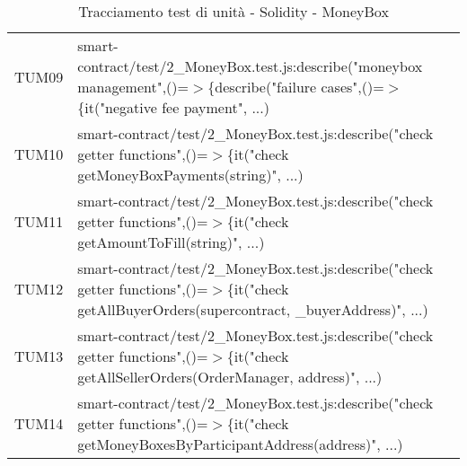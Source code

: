 \begin{table}[H]
\begin{tabular}{c|p{15cm}}
    TUM09 & smart-contract/test/2\_MoneyBox.test.js:describe("moneybox management",\newline()=$>$\{describe("failure cases",()=$>$\{it("negative fee payment", ...)                              \\
    TUM10 & smart-contract/test/2\_MoneyBox.test.js:describe("check getter functions",\newline()=$>$\{it("check getMoneyBoxPayments(string)", ...)                                               \\
    TUM11 & smart-contract/test/2\_MoneyBox.test.js:describe("check getter functions",\newline()=$>$\{it("check getAmountToFill(string)", ...)                                                   \\
    TUM12 & smart-contract/test/2\_MoneyBox.test.js:describe("check getter functions",\newline()=$>$\{it("check getAllBuyerOrders(supercontract, \_buyerAddress)", ...)                          \\
    TUM13 & smart-contract/test/2\_MoneyBox.test.js:describe("check getter functions",\newline()=$>$\{it("check getAllSellerOrders(OrderManager, address)", ...)                                 \\
    TUM14 & smart-contract/test/2\_MoneyBox.test.js:describe("check getter functions",\newline()=$>$\{it("check getMoneyBoxesByParticipantAddress(address)", ...)                                \\
  \end{tabular}
  \caption{Tracciamento test di unità - Solidity - MoneyBox}
\end{table}